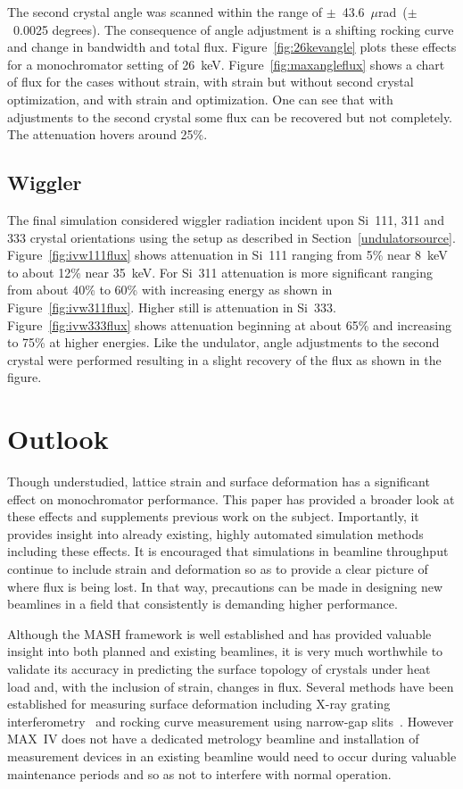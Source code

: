 \documentclass{iucr}
\begin{document}
The second crystal angle was scanned within the range of $\pm$~43.6~$\mu$rad~($\pm$~0.0025 degrees). The consequence of angle adjustment is a shifting rocking curve and change in bandwidth and total flux. Figure~\ref{fig:26kevangle} plots these effects for a monochromator setting of 26~keV. Figure~\ref{fig:maxangleflux} shows a chart of flux for the cases without strain, with strain but without second crystal optimization, and with strain and optimization. One can see that with adjustments to the second crystal some flux can be recovered but not completely. The attenuation hovers around 25\%.

\subsection{Wiggler}
The final simulation considered wiggler radiation incident upon Si~111, 311 and 333 crystal orientations using the setup as described in Section~\ref{undulatorsource}. Figure~\ref{fig:ivw111flux} shows attenuation in Si~111 ranging from 5\% near 8~keV to about 12\% near 35~keV. For Si~311 attenuation is more significant ranging from about 40\% to 60\% with increasing energy as shown in Figure~\ref{fig:ivw311flux}. Higher still is attenuation in Si~333. Figure~\ref{fig:ivw333flux} shows attenuation beginning at about 65\% and increasing to 75\% at higher energies. Like the undulator, angle adjustments to the second crystal were performed resulting in a slight recovery of the flux as shown in the figure.




\section{Outlook}

Though understudied, lattice strain and surface deformation has a significant effect on monochromator performance. This paper has provided a broader look at these effects and supplements previous work on the subject. Importantly, it provides insight into already existing, highly automated simulation methods including these effects. It is encouraged that simulations in beamline throughput continue to include strain and deformation so as to provide a clear picture of where flux is being lost. In that way, precautions can be made in designing new beamlines in a field that consistently is demanding higher performance.

Although the MASH framework is well established and has provided valuable insight into both planned and existing beamlines, it is very much worthwhile to validate its accuracy in predicting the surface topology of crystals under heat load and, with the inclusion of strain, changes in flux. Several methods have been established for measuring surface deformation including X-ray grating interferometry~\cite{rutishauser} and rocking curve measurement using narrow-gap slits~\cite{Zhang}. However MAX~IV does not have a dedicated metrology beamline and installation of measurement devices in an existing beamline would need to occur during valuable maintenance periods and so as not to interfere with normal operation.
\end{document}
